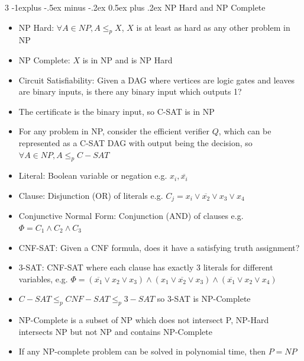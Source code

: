 \documentclass[10pt, landscape]{article}
\makeatletter
\renewcommand{\section}{\@startsection{section}{1}{0mm}%
                                {-1ex plus -.5ex minus -.2ex}%
                                {0.5ex plus .2ex}%
                                {\normalfont\large\bfseries}}
\renewcommand{\section}{\@startsection{section}{2}{0mm}%
                                {-1explus -.5ex minus -.2ex}%
                                {0.5ex plus .2ex}%
                                {\normalfont\normalsize\bfseries}}
\makeatother
\begin{document}
\begin{multicols*}{3}
\section{NP Hard and NP Complete}
\begin{itemize}
    \item NP Hard: $\forall A \in NP, A \leq_p X$, $X$ is at least as hard as any other problem in NP
    \item NP Complete: $X$ is in NP and is NP Hard
    \item Circuit Satisfiability: Given a DAG where vertices are logic gates and leaves are binary inputs, is there any binary input which outputs 1?
    \item The certificate is the binary input, so C-SAT is in NP
    \item For any problem in NP, consider the efficient verifier $Q$, which can be represented as a C-SAT DAG with output being the decision, so $\forall A \in NP, A \leq_p C-SAT$
    \item Literal: Boolean variable or negation e.g. $x_i, \overline{x_i}$
    \item Clause: Disjunction (OR) of literals e.g. $C_j=x_i \lor \overline{x_2} \lor x_3 \lor x_4$
    \item Conjunctive Normal Form: Conjunction (AND) of clauses e.g. $\Phi = C_1 \land C_2 \land C_3$
    \item CNF-SAT: Given a CNF formula, does it have a satisfying truth assignment?
    \item 3-SAT: CNF-SAT where each clause has exactly 3 literals for different variables, e.g. $\Phi = (\overline{x_1} \lor x_2 \lor x_3) \land (x_1 \lor \overline{x_2} \lor x_3) \land (\overline{x_1}\lor x_2 \lor x_4)$
    \item $C-SAT \leq_p CNF-SAT \leq_p 3-SAT$ so 3-SAT is NP-Complete
    \item NP-Complete is a subset of NP which does not intersect P, NP-Hard intersects NP but not NP and contains NP-Complete
    \item If any NP-complete problem can be solved in polynomial time, then $P=NP$
\end{itemize}


\end{multicols*}
\end{document}
